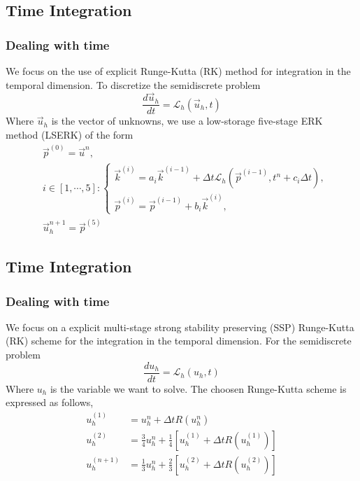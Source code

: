 \subsection{Time Integration}
\begin{frame} \frametitle{Dealing with time}
	We focus on the use of explicit Runge-Kutta (RK) method for integration in the temporal dimension. To discretize the semidiscrete problem
	\begin{equation}
		\frac{d\vec{u}_h}{dt} = \mathcal{L}_h(\vec{u}_h,t)
	\label{eq:semidiscrete_problem}
	\end{equation}
	Where $\vec{u}_h$ is the vector of unknowns, we use a low-storage five-stage ERK method (LSERK) of the form
	\begin{equation}
		\begin{split}
		&\vec{p}^{(0)} = \vec{u}^n, \\
		&i \in [1,\cdots,5]: 
		\begin{cases}
			\vec{k}^{(i)} = a_i \vec{k}^{(i-1)} + \Delta t \mathcal{L}_h(\vec{p}^{(i-1)},t^n+c_i \Delta t), \\
			\vec{p}^{(i)} = \vec{p}^{(i-1)} + b_i \vec{k}^{(i)},
		\end{cases}\\
		&\vec{u}_h^{n+1} = \vec{p}^{(5)} 
	\end{split}
	\end{equation}
\end{frame}

\subsection{Time Integration}
\begin{frame} \frametitle{Dealing with time}
	We focus on a explicit multi-stage strong stability preserving (SSP) Runge-Kutta (RK) scheme for the integration in the temporal dimension. For the semidiscrete problem
	\begin{equation}
		\frac{du_h}{dt} = \mathcal{L}_h(u_h,t)
	\label{eq:semidiscrete_problem}
	\end{equation}
	Where $u_h$ is the variable we want to solve. The choosen Runge-Kutta scheme is expressed as follows,
	\begin{equation}
		\begin{split}
		u_h^{(1)}   &= u_h^{n} + \Delta t R(u_h^{n}) \\
		u_h^{(2)}   &= \frac{3}{4} u_h^{n} + \frac{1}{4}[u_h^{(1)}+\Delta t R(u_h^{(1)})] \\
		u_h^{(n+1)} &= \frac{1}{3} u_h^{n} + \frac{2}{3}[u_h^{(2)}+\Delta t R(u_h^{(2)})]
	\end{split}
	\end{equation}
\end{frame}